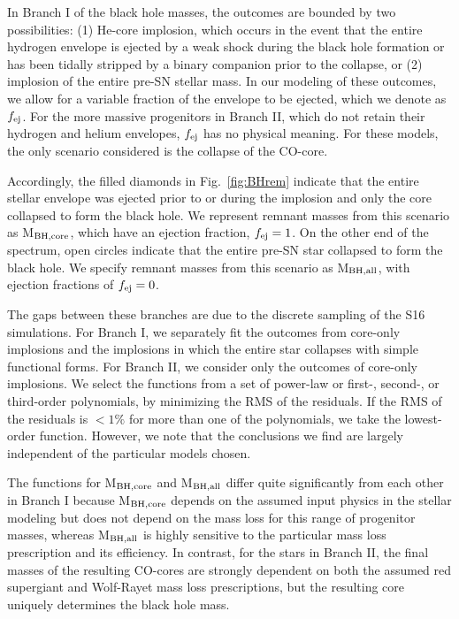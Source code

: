 \documentclass[]{emulateapj}
\newcommand{\fe}{f_{\rm ej}}
\begin{document}
In Branch I of the black hole masses, the outcomes are bounded by two possibilities: (1) He-core implosion, which occurs in the event that the entire hydrogen envelope is ejected by a weak shock during the black hole formation or has been tidally stripped by a binary companion prior to the collapse, or (2) implosion of the entire pre-SN stellar mass. In our modeling of these outcomes, we allow for a variable fraction of the envelope to be ejected, which we denote as $\fe$. For the more massive progenitors in Branch II, which do not retain their hydrogen and helium envelopes, $\fe$ has no physical meaning. For these models, the only scenario considered is the collapse of the CO-core.

Accordingly, the filled diamonds in Fig.~\ref{fig:BHrem} indicate that the entire stellar envelope was ejected prior to or during the implosion and only the core collapsed to form the black hole. We represent remnant masses from this scenario as M$_{\rm BH,core}$, which have an ejection fraction, $\fe=1$. On the other end of the spectrum, open circles indicate that the entire pre-SN star collapsed to form the black hole. We specify remnant masses from this scenario as M$_{\rm BH,all}$, with ejection fractions of $\fe=0$.

The gaps between these branches are due to the discrete sampling of the S16 simulations. For Branch I, we separately fit the outcomes from core-only implosions and the implosions in which the entire star collapses with simple functional forms. For Branch II, we consider only the outcomes of core-only implosions. We select the functions from a set of power-law or first-, second-, or third-order polynomials, by minimizing the RMS of the residuals. If the RMS of the residuals is $<1\%$ for more than one of the polynomials, we take the lowest-order function. However, we note that the conclusions we find are largely independent of the particular models chosen.

The functions for  M$_{\rm BH,core}$ and  M$_{\rm BH,all}$ differ quite significantly from each other in Branch I because M$_{\rm BH,core}$ depends on the assumed input physics in the stellar modeling but does not depend on the mass loss for this range of progenitor masses, whereas M$_{\rm BH,all}$ is highly sensitive to the particular mass loss prescription and its efficiency. In contrast, for the stars in Branch II, the final masses of the resulting CO-cores are strongly dependent on both the assumed red supergiant and Wolf-Rayet mass loss prescriptions, but the resulting core uniquely determines the black hole mass.
\end{document}
